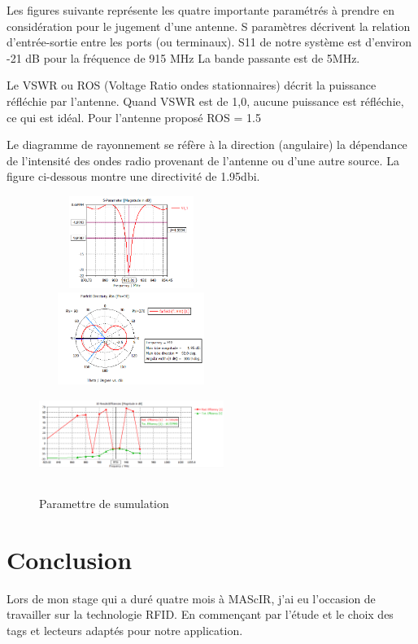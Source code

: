 \documentclass[11pt, a4paper, twoside]{book}
\begin{document}
Les figures suivante représente les quatre importante paramétrés à prendre en considération pour le jugement d'une antenne. S paramètres décrivent la relation d'entrée-sortie entre les ports (ou terminaux). S11 de notre système est d'environ -21 dB pour la fréquence de 915 MHz La bande passante est de 5MHz.

Le VSWR ou ROS (Voltage Ratio ondes stationnaires) décrit la puissance réfléchie par l'antenne. Quand VSWR est de 1,0, aucune puissance est réfléchie, ce qui est idéal. Pour l'antenne proposé ROS = 1.5

Le diagramme de rayonnement se réfère à la direction (angulaire) la dépendance de l'intensité des ondes radio provenant de l'antenne ou d'une autre source. La figure ci-dessous montre une directivité de 1.95dbi.

\begin{figure}[H]
\centering
\includegraphics[width=6cm,height=3cm]{uses11}
\includegraphics[width=6cm,height=3cm]{usefar}
\includegraphics[width=6cm,height=3cm]{useeff}
\caption{Paramettre de sumulation}
\end{figure} 

\chapter*{Conclusion}
Lors de mon stage qui a duré quatre mois à MAScIR, j'ai eu l'occasion de travailler sur la technologie RFID. En commençant par l'étude et le choix des tags et lecteurs adaptés pour notre application.\\
\end{document}
